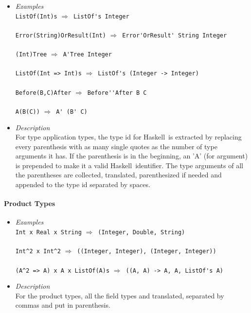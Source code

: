 \documentclass[diploma]{softlab-thesis}
\def\H{Haskell}
\def\lra{$\Longrightarrow$\ }
\begin{document}
\begin{itemize}
\item
\textit{Examples}\\

\verb|ListOf(Int)s| \lra \verb|ListOf's Integer|\\\\
\verb|Error(String)OrResult(Int)| \lra \verb|Error'OrResult' String Integer|\\\\
\verb|(Int)Tree| \lra \verb|A'Tree Integer|\\\\
\verb|ListOf(Int => Int)s| \lra \verb|ListOf's (Integer -> Integer)|\\\\
\verb|Before(B,C)After| \lra \verb|Before''After B C|\\\\
\verb|A(B(C))| \lra \verb|A' (B' C)|\\

\item
\textit{Description}\\

For type application types, the type id for \H\ is extracted by replacing every
parenthesis with as many single quotes as the number of type arguments it has.
If the parenthesis is in the beginning, an 'A' (for argument) is prepended to
make it a valid \H\ identifier.  The type arguments of all the parentheses are
collected, translated, parenthesized if needed and appended to the type id
separated by spaces.

\end{itemize}

\paragraph{Product Types}

\begin{itemize}
\item
\textit{Examples}\\

\verb|Int x Real x String| \lra \verb|(Integer, Double, String)|\\\\
\verb|Int^2 x Int^2| \lra \verb|((Integer, Integer), (Integer, Integer))|\\\\
\verb|(A^2 => A) x A x ListOf(A)s| \lra \verb|((A, A) -> A, A, ListOf's A)|\\
\item
\textit{Description}\\

For the product types, all the field types and translated, separated by commas
and put in parenthesis.

\end{itemize}
\end{document}
